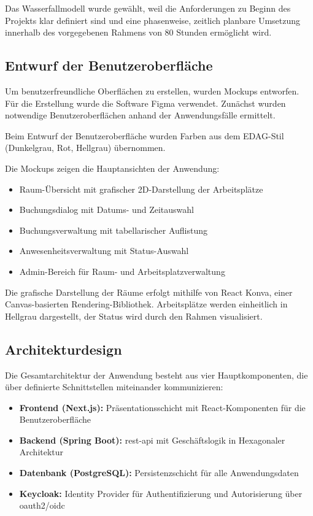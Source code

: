 \documentclass[11pt,a4paper]{report}
\begin{document}
Das Wasserfallmodell wurde gewählt, 
weil die Anforderungen zu Beginn des Projekts klar definiert sind 
und eine phasenweise, zeitlich planbare Umsetzung innerhalb des vorgegebenen Rahmens von 80 Stunden ermöglicht wird.

\subsection{Entwurf der Benutzeroberfläche}

Um benutzerfreundliche Oberflächen zu erstellen, wurden Mockups entworfen. Für die Erstellung wurde die Software Figma verwendet. Zunächst wurden notwendige Benutzeroberflächen anhand der Anwendungsfälle ermittelt.

Beim Entwurf der Benutzeroberfläche wurden Farben aus dem EDAG-Stil (Dunkelgrau, Rot, Hellgrau) übernommen. 

Die Mockups zeigen die Hauptansichten der Anwendung:
\begin{itemize}
    \item Raum-Übersicht mit grafischer 2D-Darstellung der Arbeitsplätze
    \item Buchungsdialog mit Datums- und Zeitauswahl
    \item Buchungsverwaltung mit tabellarischer Auflistung
    \item Anwesenheitsverwaltung mit Status-Auswahl
    \item Admin-Bereich für Raum- und Arbeitsplatzverwaltung
\end{itemize}

Die grafische Darstellung der Räume erfolgt mithilfe von React Konva, einer Canvas-basierten Rendering-Bibliothek. Arbeitsplätze werden einheitlich in Hellgrau dargestellt, der Status wird durch den Rahmen visualisiert.

\subsection{Architekturdesign}

Die Gesamtarchitektur der Anwendung besteht aus vier Hauptkomponenten, die über definierte Schnittstellen miteinander kommunizieren:

\begin{itemize}
    \item \textbf{Frontend (Next.js):} Präsentationsschicht mit React-Komponenten für die Benutzeroberfläche
    \item \textbf{Backend (Spring Boot):} \gls{rest}-\gls{api} mit Geschäftslogik in Hexagonaler Architektur
    \item \textbf{Datenbank (PostgreSQL):} Persistenzschicht für alle Anwendungsdaten
    \item \textbf{Keycloak:} Identity Provider für Authentifizierung und Autorisierung über \gls{oauth2}/\gls{oidc}
\end{itemize}
\end{document}
